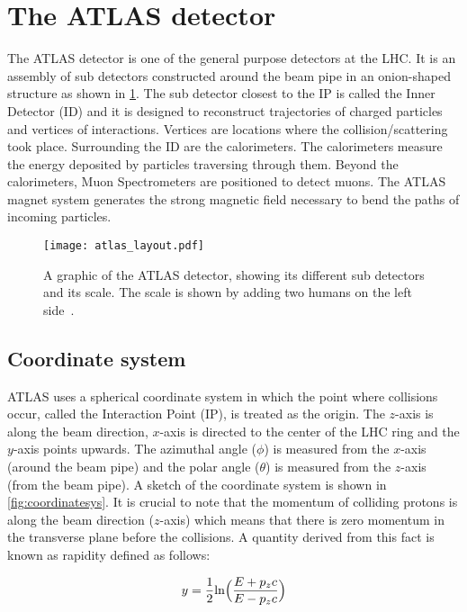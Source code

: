\section{The ATLAS detector}
\label{sec:ATLAS}
The ATLAS detector is one of the general purpose detectors at the LHC. It is an assembly of sub detectors constructed around the beam pipe in an onion-shaped structure as shown
in \cref{fig:atlas}. The sub detector closest to the IP is called the Inner Detector (ID) and it
is designed to reconstruct trajectories of charged particles and vertices of interactions. Vertices are
locations where the collision/scattering took place. Surrounding the ID are the calorimeters.
The calorimeters measure the energy deposited by particles traversing through them. Beyond the 
calorimeters, Muon Spectrometers are positioned to detect muons. The ATLAS magnet system generates 
the strong magnetic field necessary to bend the paths of incoming particles.

\begin{figure}[htbp]
    \centering
    \texttt{[image: atlas\_layout.pdf]}
    \caption[Overview of the ATLAS detector]{A graphic of the ATLAS detector, showing its different 
    sub detectors and its scale. The scale is shown by adding two humans on the left side~\cite{Pequenao:1095924}.}%
    \label{fig:atlas}
\end{figure}

\subsection{Coordinate system}
ATLAS uses a spherical coordinate system in which the point where collisions occur, called the 
Interaction Point (IP), is treated as the origin. The $z$-axis is along the beam direction, $x$-axis is
directed to the center of the LHC ring and the $y$-axis points upwards. The azimuthal angle ($\phi$) 
is measured from the $x$-axis (around the beam pipe) and the polar angle ($\theta$) is measured 
from the $z$-axis (from the beam pipe). A sketch of the coordinate
system is shown in \cref{fig:coordinatesys}. It is crucial to note that the momentum of colliding protons
is along the beam direction ($z$-axis) which means that there is zero momentum in the transverse plane before
the collisions. A quantity derived from this fact is known as rapidity defined as follows:


\begin{equation}
    y = \frac{1}{2}\text{ln} \Bigl(\frac{E+p_zc}{E-p_zc}\Bigl)
\end{equation}


